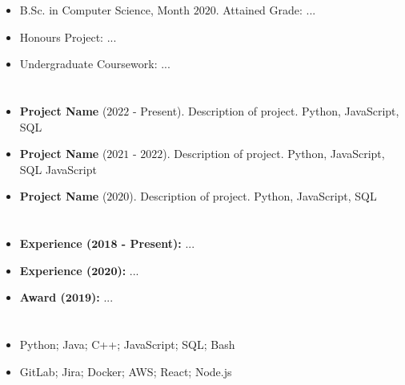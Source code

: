 \documentclass{article}[10pt]
\begin{document}
{ \hfill
   \hfill 
  }

\begin{itemize}
	\item B.Sc. in Computer Science, Month $2020$. Attained Grade: ...
	\item Honours Project: ...
	\item Undergraduate Coursework: ...
\end{itemize}

\section*{\underline{}}

\begin{itemize}
	\item \textbf{Project Name} ($2022$ - Present). Description of project. Python, JavaScript, SQL
	\item \textbf{Project Name} ($2021$ - $2022$). Description of project. Python, JavaScript, SQL JavaScript
	\item \textbf{Project Name} ($2020$). Description of project. Python, JavaScript, SQL
\end{itemize}

\section*{\underline{}}

\begin{itemize}
	\item \textbf{Experience ($\bm{2018}$ - Present):} ...
	\item \textbf{Experience ($\bm{2020}$):} ...
	\item \textbf{Award ($\bm{2019}$):} ...
\end{itemize}

\section*{\underline{}}
\begin{itemize}
	\item Python; Java; C++; JavaScript; SQL; Bash
	\item GitLab; Jira; Docker; AWS; React; Node.js
\end{itemize}
\end{document}

